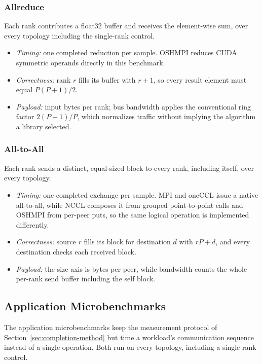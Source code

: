 \subsubsection{Allreduce}

Each rank contributes a float32 buffer and receives the element-wise sum, over every topology including the single-rank control.
\begin{itemize}
    \item \emph{Timing:} one completed reduction per sample. OSHMPI reduces CUDA symmetric operands directly in this benchmark.
    \item \emph{Correctness:} rank $r$ fills its buffer with $r+1$, so every result element must equal $P(P+1)/2$.
    \item \emph{Payload:} input bytes per rank; bus bandwidth applies the conventional ring factor $2(P-1)/P$, which normalizes traffic without implying the algorithm a library selected.
\end{itemize}

\subsubsection{All-to-All}

Each rank sends a distinct, equal-sized block to every rank, including itself, over every topology.
\begin{itemize}
    \item \emph{Timing:} one completed exchange per sample. MPI and oneCCL issue a native all-to-all, while NCCL composes it from grouped point-to-point calls and OSHMPI from per-peer puts, so the same logical operation is implemented differently.
    \item \emph{Correctness:} source $r$ fills its block for destination $d$ with $rP+d$, and every destination checks each received block.
    \item \emph{Payload:} the size axis is bytes per peer, while bandwidth counts the whole per-rank send buffer including the self block.
\end{itemize}

\subsection{Application Microbenchmarks}

The application microbenchmarks keep the measurement protocol of Section~\ref{sec:completion-method} but time a workload's communication sequence instead of a single operation. Both run on every topology, including a single-rank control.


